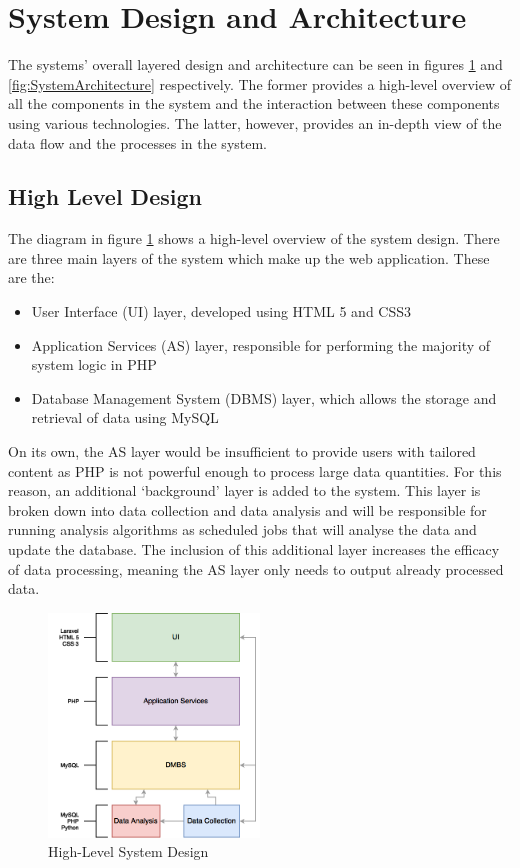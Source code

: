 \section{System Design and Architecture}
The systems' overall layered design and architecture can be seen in figures \ref{fig:LayerArchitecture} and \ref{fig:SystemArchitecture} respectively. The former provides a high-level overview of all the components in the system and the interaction between these components using various technologies. The latter, however, provides an in-depth view of the data flow and the processes in the system.

\subsection{High Level Design}
The diagram in figure \ref{fig:LayerArchitecture} shows a high-level overview of the system design. There are three main layers of the system which make up the web application. These are the:

\begin{itemize}
\item User Interface (UI) layer, developed using HTML 5 and CSS3
\item Application Services (AS) layer, responsible for performing the majority of system logic in PHP
\item Database Management System (DBMS) layer, which allows the storage and retrieval of data using MySQL
\end{itemize}

On its own, the AS layer would be insufficient to provide users with tailored content as PHP is not powerful enough to process large data quantities. For this reason, an additional `background' layer is added to the system. This layer is broken down into data collection and data analysis and will be responsible for running analysis algorithms as scheduled jobs that will analyse the data and update the database. The inclusion of this additional layer increases the efficacy of data processing, meaning the AS layer only needs to output already processed data.

\begin{figure}[H]
  \centering
  \includegraphics[width=0.5\textwidth]{Images/Design/LayerArchitecture}
  \caption{High-Level System Design} \label{fig:LayerArchitecture} 
\end{figure}

